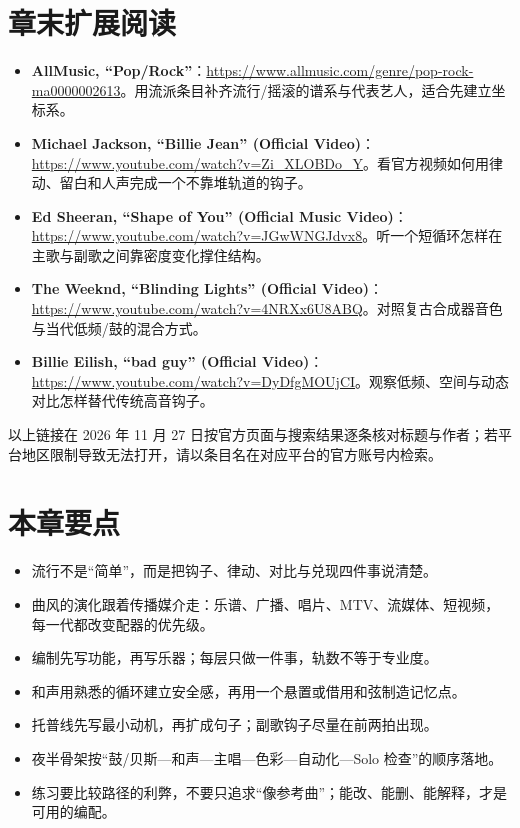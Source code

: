 \section{章末扩展阅读}
\label{sec:pop-reading}

\begin{sloppypar}
\begin{itemize}
\item \textbf{AllMusic, “Pop/Rock”}：\url{https://www.allmusic.com/genre/pop-rock-ma0000002613}。用流派条目补齐流行/摇滚的谱系与代表艺人，适合先建立坐标系。
\item \textbf{Michael Jackson, “Billie Jean” (Official Video)}：\url{https://www.youtube.com/watch?v=Zi_XLOBDo_Y}。看官方视频如何用律动、留白和人声完成一个不靠堆轨道的钩子。
\item \textbf{Ed Sheeran, “Shape of You” (Official Music Video)}：\url{https://www.youtube.com/watch?v=JGwWNGJdvx8}。听一个短循环怎样在主歌与副歌之间靠密度变化撑住结构。
\item \textbf{The Weeknd, “Blinding Lights” (Official Video)}：\url{https://www.youtube.com/watch?v=4NRXx6U8ABQ}。对照复古合成器音色与当代低频/鼓的混合方式。
\item \textbf{Billie Eilish, “bad guy” (Official Video)}：\url{https://www.youtube.com/watch?v=DyDfgMOUjCI}。观察低频、空间与动态对比怎样替代传统高音钩子。
\end{itemize}
\end{sloppypar}

以上链接在 2026 年 11 月 27 日按官方页面与搜索结果逐条核对标题与作者；若平台地区限制导致无法打开，请以条目名在对应平台的官方账号内检索。

\section{本章要点}
\label{sec:pop-takeaways}

\begin{itemize}
\item 流行不是“简单”，而是把钩子、律动、对比与兑现四件事说清楚。
\item 曲风的演化跟着传播媒介走：乐谱、广播、唱片、MTV、流媒体、短视频，每一代都改变配器的优先级。
\item 编制先写功能，再写乐器；每层只做一件事，轨数不等于专业度。
\item 和声用熟悉的循环建立安全感，再用一个悬置或借用和弦制造记忆点。
\item 托普线先写最小动机，再扩成句子；副歌钩子尽量在前两拍出现。
\item 夜半骨架按“鼓/贝斯—和声—主唱—色彩—自动化—Solo 检查”的顺序落地。
\item 练习要比较路径的利弊，不要只追求“像参考曲”；能改、能删、能解释，才是可用的编配。
\end{itemize}

